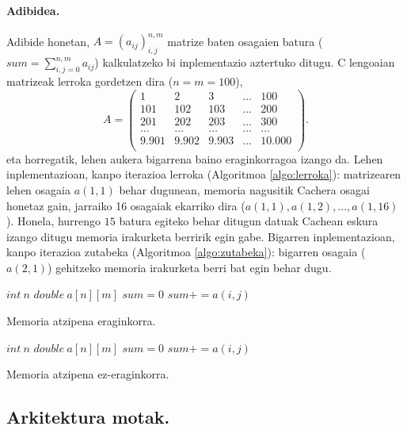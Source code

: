 \paragraph*{Adibidea.} Adibide honetan, $A=(a_{ij})_{i,j}^{n,m}$ matrize baten osagaien batura ($sum=\sum_{i,j=0}^{n,m} a_{ij}$) kalkulatzeko bi inplementazio aztertuko ditugu. C lengoaian matrizeak lerroka gordetzen dira ($n=m=100$),
\begin{equation*}
A=\left(\begin{array}{ccccc}
  1    & 2    & 3    & \dots & 100 \\
  101 & 102 & 103 &\dots & 200 \\
  201 & 202 & 203 &\dots & 300 \\
  \dots & \dots & \dots & \dots & \dots \\
  9.901 & 9.902 & 9.903 &\dots & 10.000 \\
  \end{array}\right).  
\end{equation*}
eta horregatik, lehen aukera bigarrena baino eraginkorragoa izango da. Lehen inplementazioan, kanpo iterazioa lerroka (Algoritmoa \ref{algo:lerroka}):  matrizearen lehen osagaia $a(1,1)$ behar dugunean, memoria nagusitik Cachera osagai honetaz gain, jarraiko 16 osagaiak ekarriko dira ($a(1,1),a(1,2),\dots,a(1,16)$). Honela, hurrengo $15$ batura egiteko behar ditugun datuak Cachean eskura izango ditugu memoria irakurketa berririk egin gabe. Bigarren inplementazioan, kanpo iterazioa zutabeka (Algoritmoa \ref{algo:zutabeka}): bigarren osagaia ($a(2,1)$) gehitzeko memoria irakurketa berri bat egin behar dugu. 

\begin{algorithm}[h]
 \BlankLine
  $int \ n$\;
  $double \ a[n][m]$\;
  \BlankLine
  $sum=0$\;
  {
   \BlankLine
   {
    \BlankLine 
    $sum+=a(i,j)$\;
   }
 }
 \caption{Memoria atzipena eraginkorra.}
 \label{algo:lerroka}
\end{algorithm} 
\begin{algorithm}[h]
 \BlankLine
  $int \ n$\;
  $double \ a[n][m]$\;
  \BlankLine
  $sum=0$\;
  {
   \BlankLine
   {
    \BlankLine 
    $sum+=a(i,j)$\;
   }
 }
 \caption{Memoria atzipena ez-eraginkorra.}
 \label{algo:zutabeka}
\end{algorithm} 


\subsection*{Arkitektura motak.}

